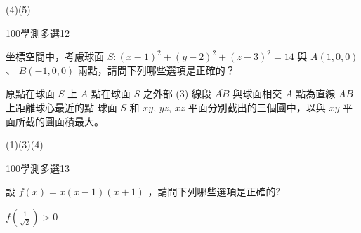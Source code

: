\begin{QUESTIONS}
\begin{QUESTION}
        \begin{QANS}
            (4)(5)
        \end{QANS}
        \begin{QSOLLIST}
        \end{QSOLLIST}
        \begin{QEMPTYSPACE}
        \end{QEMPTYSPACE}
    \end{QUESTION}
    \begin{QUESTION}
        \begin{ExamInfo}{100}{學測}{多選}{12}
        \end{ExamInfo}
        \begin{ExamAnsRateInfo}{54}{84}{53}{25}
        \end{ExamAnsRateInfo}
        \begin{QBODY}
            坐標空間中，考慮球面 $S:(x-1)^2+(y-2)^2+(z-3)^2 = 14 $ 與 $A(1,0,0)$ 、 $B(-1,0,0)$ 兩點，請問下列哪些選項是正確的？ 
			\begin{QOPS} 
				\QOP 原點在球面 $S$ 上 
				\QOP $A$ 點在球面 $S$ 之外部 (3) 線段 $\overline{AB}$ 與球面相交 
				\QOP $A$ 點為直線 $AB$ 上距離球心最近的點  
				\QOP 球面 $S$ 和 $xy$, $yz$, $xz$ 平面分別截出的三個圓中，以與 $xy$ 平面所截的圓面積最大。
			\end{QOPS}
        \end{QBODY}
        \begin{QFROMS}
        \end{QFROMS}
        \begin{QTAGS}\end{QTAGS}
        \begin{QANS}
            (1)(3)(4)
        \end{QANS}
        \begin{QSOLLIST}
        \end{QSOLLIST}
        \begin{QEMPTYSPACE}
        \end{QEMPTYSPACE}
    \end{QUESTION}
    \begin{QUESTION}
        \begin{ExamInfo}{100}{學測}{多選}{13}
        \end{ExamInfo}
        \begin{ExamAnsRateInfo}{39}{64}{32}{21}
        \end{ExamAnsRateInfo}
        \begin{QBODY}
            設 $f(x) = x(x -1)(x +1)$ ，請問下列哪些選項是正確的? 
			\begin{QOPS} 
				\QOP $f(\frac{1}{\sqrt{2}})>0$


\end{QOPS}
\end{QBODY}
\end{QUESTION}
\end{QUESTIONS}
